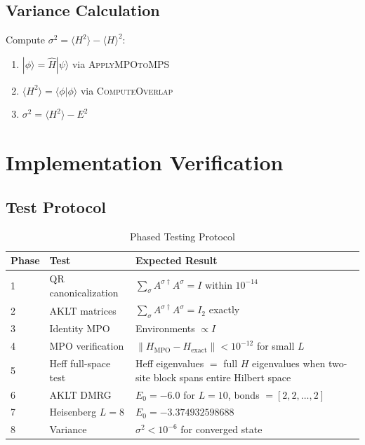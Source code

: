\documentclass[aps,prb,onecolumn,scriptaddress]{revtex4-2}
\begin{document}
\subsection{Variance Calculation}

Compute $\sigma^2 = \langle H^2 \rangle - \langle H \rangle^2$:
\begin{enumerate}
\item $|\phi\rangle = \hat{H}|\psi\rangle$ via \textsc{ApplyMPOtoMPS}
\item $\langle H^2\rangle = \langle\phi|\phi\rangle$ via \textsc{ComputeOverlap}
\item $\sigma^2 = \langle H^2\rangle - E^2$
\end{enumerate}

\section{Implementation Verification}

\subsection{Test Protocol}

\begin{table}[h]
\centering
\caption{Phased Testing Protocol}
\begin{tabular}{@{}llp{6cm}@{}}
\toprule
\textbf{Phase} & \textbf{Test} & \textbf{Expected Result} \\
\midrule
1 & QR canonicalization & $\sum_\sigma A^{\sigma\dagger} A^\sigma = I$ within $10^{-14}$ \\
2 & AKLT matrices & $\sum_\sigma A^{\sigma\dagger} A^\sigma = I_2$ exactly \\
3 & Identity MPO & Environments $\propto I$ \\
4 & MPO verification & $\|H_{\text{MPO}} - H_{\text{exact}}\| < 10^{-12}$ for small $L$ \\
5 & Heff full-space test & Heff eigenvalues $=$ full $H$ eigenvalues when two-site block spans entire Hilbert space \\
6 & AKLT DMRG & $E_0 = -6.0$ for $L=10$, bonds $=[2,2,\ldots,2]$ \\
7 & Heisenberg $L=8$ & $E_0 = -3.374932598688$ \\
8 & Variance & $\sigma^2 < 10^{-6}$ for converged state \\
\bottomrule
\end{tabular}
\end{table}
\end{document}

